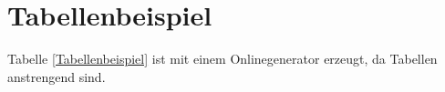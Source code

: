 \section{Tabellenbeispiel}

Tabelle \ref{Tabellenbeispiel} ist mit einem Onlinegenerator erzeugt, da Tabellen anstrengend sind.

\begin{table}[]
\caption{Tabellenbeispiel}
\label{Tabellenbeispiel}
\end{table}
